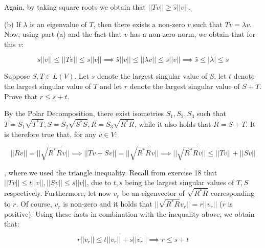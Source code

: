 \begin{solution}
    Again, by taking square roots we obtain that $\lvert \lvert Tv \rvert \rvert \geq \hat{s} \lvert \lvert v \rvert \rvert$.
    
     (b) If $\lambda$ is an eigenvalue of $T$, then there exists a non-zero $v$ such that $Tv = \lambda v$. Now, using part (a) and the fact that $v$ has a non-zero norm, we obtain that for this $v$:

     $$\hat{s} \lvert \lvert v \rvert \rvert \leq \lvert \lvert Tv \rvert \rvert \leq s \lvert \lvert v \rvert \rvert \implies \hat{s} \lvert \lvert v \rvert \rvert \leq \lvert \lvert \lambda v \rvert \rvert \leq s \lvert \lvert v \rvert \rvert \implies \hat{s} \leq \rvert \lambda \rvert \leq s$$
 \end{solution}

 \begin{exercise}{20}
     Suppose $S, T \in L(V)$. Let $s$ denote the largest singular value of $S$, let $t$ denote the largest singular value of $T$ and let $r$ denote the largest singular value of $S + T$. Prove that $r \leq s + t$.
 \end{exercise}

 \begin{solution}

     By the Polar Decomposition, there exist isometries $S_1, S_2, S_3$ such that $T = S_1 \sqrt{T^*T}, S = S_2 \sqrt{S^*S}, R = S_3 \sqrt{R^*R}$, while it also holds that $R = S + T$. It is therefore true that, for any $v \in V$:

     $$\lvert \lvert Rv \rvert \rvert = \lvert \lvert \sqrt{R^*R}v \rvert \rvert \implies \lvert \lvert Tv + Sv \rvert \rvert = \lvert \lvert \sqrt{R^*R}v \rvert \rvert \implies \lvert \lvert \sqrt{R^*R} v\rvert \rvert \leq \lvert \lvert Tv \rvert \rvert + \lvert \lvert Sv \rvert \rvert$$

     , where we used the triangle inequality. Recall from exercise 18 that $\lvert \lvert T v \rvert \rvert \leq t \lvert \lvert v \rvert \rvert, \lvert \lvert S v \rvert \rvert \leq s \lvert \lvert v \rvert \rvert$, due to $t, s$ being the largest singular values of $T, S$ respectively. Furthermore, let now $v_r$ be an eigenvector of $\sqrt{R^*R}$ corresponding to $r$. Of course, $v_r$ is non-zero and it holds that $\lvert \lvert \sqrt{R^*R} v_r \rvert \rvert = r \lvert \lvert v_r \rvert \rvert$ ($r$ is positive). Using these facts in combination with the inequality above, we obtain that:

     $$r \lvert \lvert v_r \rvert \rvert \leq t \lvert \lvert v_r \rvert \rvert + s \lvert \lvert v_r \rvert \rvert \implies r \leq s + t$$
 \end{solution}